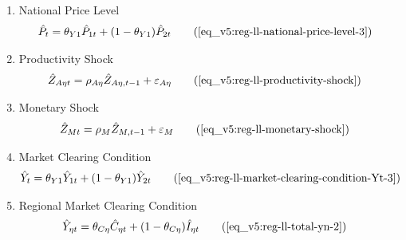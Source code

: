 \documentclass[../thesis.tex]{subfiles}
\begin{document}
{\begin{itemize}
\begin{enumerate}
		\item National Price Level
		\begin{alignat}{2}
			\hat{P}_{t} &= \theta_{Y1} \hat{P}_{1t} + (1-\theta_{Y1}) \hat{P}_{2t} \tag{\ref{eq_v5:reg-ll-national-price-level-3}}
		\end{alignat}
		
		\item Productivity Shock
		\begin{alignat}{2}
			\hat{Z}_{A\eta t} &= \rho_{A\eta} \hat{Z}_{A\eta, t-1} + \varepsilon_{A\eta} \tag{\ref{eq_v5:reg-ll-productivity-shock}}
		\end{alignat}
		
		\item Monetary Shock
		\begin{alignat}{2}
			\hat{Z}_{Mt} &= \rho_M \hat{Z}_{M,t-1} + \varepsilon_{M} \tag{\ref{eq_v5:reg-ll-monetary-shock}}
		\end{alignat}
		
		\item Market Clearing Condition
		\begin{align}
			\hat{Y}_{t} &= \theta_{Y1} \hat{Y}_{1t} + (1-\theta_{Y1}) \hat{Y}_{2t} \tag{\ref{eq_v5:reg-ll-market-clearing-condition-Yt-3}}
		\end{align}
		
		\item Regional Market Clearing Condition
		\begin{align}
			\hat{Y}_{\eta t} &= \theta_{C\eta} \hat{C}_{\eta t} + (1 - \theta_{C\eta}) \hat{I}_{\eta t} \tag{\ref{eq_v5:reg-ll-total-yn-2}}
		\end{align}
		
	\end{enumerate}
	
\end{itemize}

} %

\newpage
\end{document}
